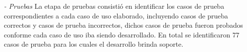     {\it - Pruebas}
    La etapa de pruebas consistió en identificar los casos de prueba correspondientes
    a cada caso de uso elaborado, incluyendo casos de prueba correctos y casos de
    prueba incorrectos, dichos casos de prueba fueron probados conforme cada caso de 
    uso iba siendo desarrollado. En total se identificaron 77 casos de prueba para
    los cuales el desarrollo brinda soporte.\\

    
